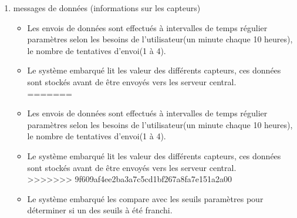 \documentclass [a4paper] {report}
\begin{document}
\begin{description}
\begin{enumerate}
	\item messages de données (informations sur les capteurs)\\
		\begin{itemize}
<<<<<<< HEAD
		\item Les envois de données sont effectués à intervalles de temps régulier paramètres selon les
		 besoins de l'utilisateur(un minute chaque 10 heures), le nombre de tentatives d'envoi(1 à 4).\\
		\item Le système embarqué lit les valeur des différents capteurs, ces données sont stockés avant 
		de être envoyés vers les serveur central.\\
=======
		\item Les envois de données sont effectués à intervalles de temps régulier paramètres selon les besoins de l'utilisateur(un minute chaque 10 heures), le nombre de tentatives d'envoi(1 à 4).\\
		\item Le système embarqué lit les valeur des différents capteurs, ces données sont stockés avant de être envoyés vers les serveur central.\\
>>>>>>> 9f609af4ee2ba3a7c5cd1bf267a8fa7e151a2a00
		\item Le système embarqué les compare avec les seuils paramètres pour déterminer si un des seuils à été franchi. \\
		\end{itemize}


\end{enumerate}
\end{description}
\end{document}
